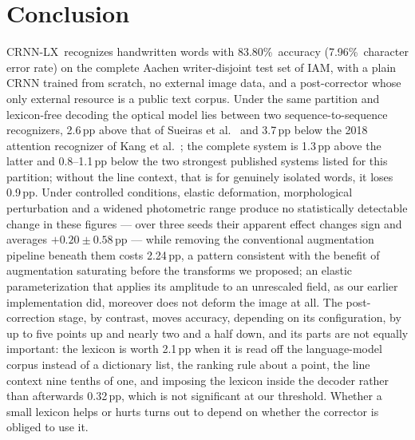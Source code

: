 \documentclass{ws-ijprai}
\newcommand{\ours}{CRNN-LX}            %
\newcommand{\ourwa}{83.80\%}
\newcommand{\ourcer}{7.96\%}
\newcommand{\anchordelta}{2.24}        %
\begin{document}
\section{Conclusion}
\label{sec:conclusion}

\ours\ recognizes handwritten words with \ourwa\ accuracy (\ourcer\
character error rate) on the complete Aachen writer-disjoint test set
of IAM, with a plain CRNN trained from scratch, no external image data,
and a post-corrector whose only external resource is a public text
corpus. Under the same partition and lexicon-free decoding the optical
model lies between two sequence-to-sequence recognizers, 2.6\,pp above that
of Sueiras et al.~\cite{sueiras2018offline} and 3.7\,pp below the 2018
attention recognizer of Kang et al.~\cite{kang2018convolve}; the complete
system is 1.3\,pp above the latter and 0.8--1.1\,pp below the two strongest
published systems listed for this partition; without the line context, that
is for genuinely isolated words, it loses 0.9\,pp. Under controlled conditions, elastic
deformation, morphological perturbation and a
widened photometric range produce no statistically detectable change
in these figures --- over three seeds their apparent effect changes
sign and averages $+0.20\pm0.58$\,pp --- while removing the
conventional augmentation pipeline beneath them costs
\anchordelta\,pp, a pattern consistent with the benefit of
augmentation saturating before the transforms we proposed; an elastic
parameterization that applies its amplitude to an unrescaled field, as our
earlier implementation did, moreover does not deform the image at all. The
post-correction stage, by contrast, moves accuracy, depending on its
configuration, by up to five points up and nearly two and a half down, and its parts
are not equally important: the lexicon is worth
2.1\,pp when it is
read off the language-model corpus instead of a dictionary list, the ranking
rule about a point, the line context nine tenths of one, and imposing the
lexicon
inside the decoder rather than afterwards
0.32\,pp, which is not significant at our
threshold. Whether a small lexicon helps or hurts turns out to depend on
whether the corrector is obliged to use it.
\end{document}
